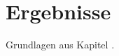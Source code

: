 
\chapter{Ergebnisse}

Grundlagen aus Kapitel \secref{\ref{sec:theory}}.
\blindtext
\blindenumerate
